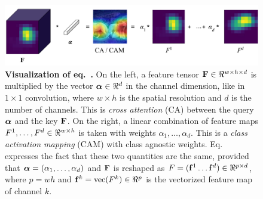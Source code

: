 \begin{figure}[t]
    \centering
    \includegraphics[width=.7\textwidth]{fig/castream/images/CA-CAM.pdf}
    \vspace{3pt}
    \caption{\textbf{Visualization of eq.~.} On the left, a feature tensor $\vF \in 
    \real^{w \times h \times d}$ is multiplied by the vector $\valpha \in \real^d$ in the channel 
    dimension, like in $1 \times 1$ convolution, where $w \times h$ is the spatial resolution and 
    $d$ is the number of channels. This is \emph{cross attention} (CA) 
    \autocite{dosovitskiy2020image} between the query ${\boldsymbol{\alpha}}$ and the key $\mathbf{F}$. On the right, a 
    linear combination of feature maps $F^1, \dots, F^d \in \real^{w \times h}$ is taken with 
    weights $\alpha_1, \dots, \alpha_d$. This is a \emph{class activation mapping} (CAM) 
    \autocite{zhou2016learning} with class agnostic weights. Eq.~ expresses the fact 
    that these two quantities are the same, provided that ${\boldsymbol{\alpha}} = (\alpha_1, \dots, \alpha_d)$ 
    and $\mathbf{F}$ is reshaped as $F = (\vf^1 \dots \vf^d) \in \real^{p \times d}$, where $p = wh$ and 
    $\vf^k = \vect(F^k) \in \real^{p}$ is the vectorized feature map of channel $k$.}
    \label{fig:connection}
\end{figure}